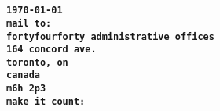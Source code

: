 \documentclass{article}
\begin{document}
\thispagestyle{empty}

\paragraph
{
\texttt
{
\\\today
\vspace{5 mm}
\\mail to:\\
fortyfourforty administrative offices\\
164 concord ave.\\
toronto, on\\
canada\\
m6h 2p3
}
\texttt
{
\vspace{5 mm}
\\make it count:\\
}
}

\framebox{\textcolor{white}{\rule{4in}{4in}}}
\end{document}
